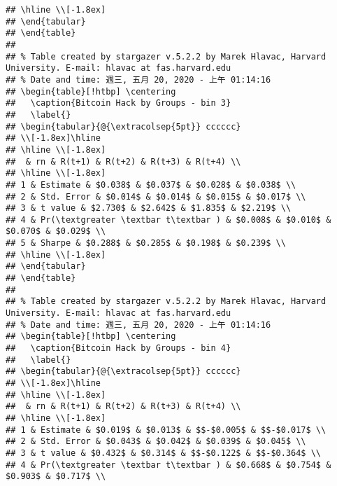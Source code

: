 \documentclass[
]{article}
\begin{document}
\begin{verbatim}
## \hline \\[-1.8ex] 
## \end{tabular} 
## \end{table} 
## 
## % Table created by stargazer v.5.2.2 by Marek Hlavac, Harvard University. E-mail: hlavac at fas.harvard.edu
## % Date and time: 週三, 五月 20, 2020 - 上午 01:14:16
## \begin{table}[!htbp] \centering 
##   \caption{Bitcoin Hack by Groups - bin 3} 
##   \label{} 
## \begin{tabular}{@{\extracolsep{5pt}} cccccc} 
## \\[-1.8ex]\hline 
## \hline \\[-1.8ex] 
##  & rn & R(t+1) & R(t+2) & R(t+3) & R(t+4) \\ 
## \hline \\[-1.8ex] 
## 1 & Estimate & $0.038$ & $0.037$ & $0.028$ & $0.038$ \\ 
## 2 & Std. Error & $0.014$ & $0.014$ & $0.015$ & $0.017$ \\ 
## 3 & t value & $2.730$ & $2.642$ & $1.835$ & $2.219$ \\ 
## 4 & Pr(\textgreater \textbar t\textbar ) & $0.008$ & $0.010$ & $0.070$ & $0.029$ \\ 
## 5 & Sharpe & $0.288$ & $0.285$ & $0.198$ & $0.239$ \\ 
## \hline \\[-1.8ex] 
## \end{tabular} 
## \end{table} 
## 
## % Table created by stargazer v.5.2.2 by Marek Hlavac, Harvard University. E-mail: hlavac at fas.harvard.edu
## % Date and time: 週三, 五月 20, 2020 - 上午 01:14:16
## \begin{table}[!htbp] \centering 
##   \caption{Bitcoin Hack by Groups - bin 4} 
##   \label{} 
## \begin{tabular}{@{\extracolsep{5pt}} cccccc} 
## \\[-1.8ex]\hline 
## \hline \\[-1.8ex] 
##  & rn & R(t+1) & R(t+2) & R(t+3) & R(t+4) \\ 
## \hline \\[-1.8ex] 
## 1 & Estimate & $0.019$ & $0.013$ & $$-$0.005$ & $$-$0.017$ \\ 
## 2 & Std. Error & $0.043$ & $0.042$ & $0.039$ & $0.045$ \\ 
## 3 & t value & $0.432$ & $0.314$ & $$-$0.122$ & $$-$0.364$ \\ 
## 4 & Pr(\textgreater \textbar t\textbar ) & $0.668$ & $0.754$ & $0.903$ & $0.717$ \\ 

\end{verbatim}
\end{document}
